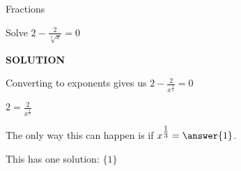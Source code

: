 \documentclass{ximera}
\begin{document}
\begin{example}  Fractions


Solve $2 - \frac{2}{\sqrt[3]{x}} = 0$



\textbf{\textcolor{purple!50!blue!90!black}{SOLUTION}}


Converting to exponents gives us $2 - \frac{2}{x^{\tfrac{1}{3}}} = 0$


$2 = \frac{2}{x^{\tfrac{1}{3}}}$

The only way this can happen is if $x^{\tfrac{1}{3}} = \answer{1}$.

This has one solution: $\{  1  \}$








\end{example}
\end{document}
